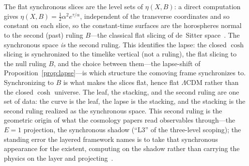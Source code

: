 \documentclass[11pt,a4paper]{article}
\theoremstyle{definition}
\begin{document}
The flat synchronous slices are the level sets of $\eta(X,B)$: a direct computation gives $\eta(X,B)=\tfrac{1}{2}\alpha^{2}e^{\tau/\alpha}$, independent of the transverse coordinates and so constant on each slice, so the constant-time surfaces are the horospheres normal to the second (past) ruling $B$---the classical flat slicing of de~Sitter space~\cite{HawkingEllis1973}. The synchronous space \emph{is} the second ruling. This identifies the lapse: the closed $\cosh$ slicing is synchronized to the timelike vertical (not a ruling), the flat slicing to the null ruling $B$, and the choice between them---the lapse-shift of Proposition~\ref{prop:lapse}---is which structure the comoving frame synchronizes to. Synchronizing to $B$ is what makes the slices flat, hence flat $\Lambda$CDM rather than the closed $\cosh$ universe. The leaf, the stacking, and the second ruling are one set of data: the curve is the leaf, the lapse is the stacking, and the stacking is the second ruling realized as the synchronous space. This second ruling is the geometric origin of what the cosmology papers read observables through---the $E=1$ projection, the synchronous shadow (``L3'' of the three-level scoping); the standing error the layered framework names is to take that synchronous appearance for the existent, computing on the shadow rather than carrying the physics on the layer and projecting~\cite{JanzenCRframework,JanzenShadowExistence,JanzenCosmogenesis}.
\end{document}
